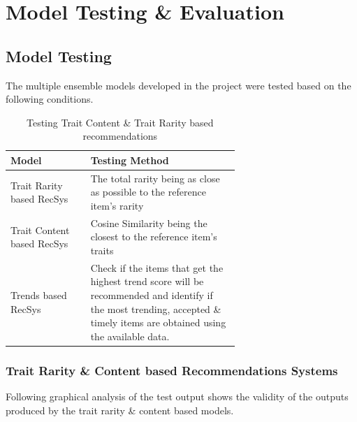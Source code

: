 \section{Model Testing \& Evaluation}

\subsection{Model Testing}



The multiple ensemble models developed in the project were tested based on the following conditions.

\begin{longtable}[h!]{|l|p{0.65\linewidth}|}
\caption{Testing Trait Content \& Trait Rarity based recommendations}
\endfirsthead
\hline
\textbf{Model} & \textbf{Testing Method} \\
\hline
Trait Rarity based RecSys & The total rarity being as close as possible to the reference item's rarity\\
\hline
Trait Content based RecSys & Cosine Similarity being the closest to the reference item's traits\\
\hline
Trends based RecSys & Check if the items that get the highest trend score will be recommended and identify if the most trending, accepted \& timely items are obtained using the available data. \\
\hline
\end{longtable}

\subsubsection{Trait Rarity \& Content based Recommendations Systems}

\noindent Following graphical analysis of the test output shows the validity of the outputs produced by the trait rarity \& content based models.


